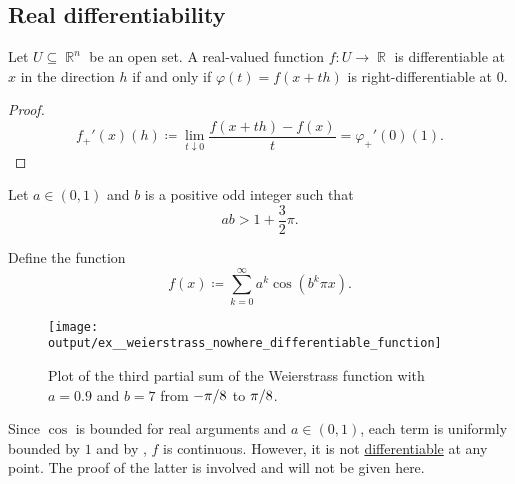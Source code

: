 \subsection{Real differentiability}\label{subsec:real_differentiability}

\begin{proposition}\label{thm:real_valued_differentiability}
  Let \( U \subseteq \BbbR^n \) be an open set. A real-valued function \( f: U \to \BbbR \) is differentiable at \( x \) in the direction \( h \) if and only if \( \varphi(t) = f(x + th) \) is right-differentiable at \( 0 \).
\end{proposition}
\begin{proof}
  \begin{equation*}
    f_+'(x)(h) \coloneqq \lim_{t \downarrow 0} \frac {f(x + th) - f(x)} t = \varphi_+'(0)(1).
  \end{equation*}
\end{proof}

\begin{example}\label{ex:weierstrass_nowhere_differentiable_function}
  Let \( a \in (0, 1) \) and \( b \) is a positive odd integer such that
  \begin{equation*}
    ab > 1 + \frac 3 2 \pi.
  \end{equation*}

  Define the function
  \begin{equation*}
    f(x) \coloneqq \sum_{k=0}^\infty a^k \cos(b^k \pi x).
  \end{equation*}

  \begin{figure}[!ht]
    \centering
    \texttt{[image: output/ex\_\_weierstrass\_nowhere\_differentiable\_function]}
    \caption
    {
      Plot of the third partial sum of the Weierstrass function with \( a = 0.9 \) and \( b = 7 \) from \( -\ifrac \pi 8 \) to \( \ifrac \pi 8 \).
    }
    \label{fig:ex:weierstrass_nowhere_differentiable_function/plot}
  \end{figure}

  Since \( \cos \) is bounded for real arguments and \( a \in (0, 1) \), each term is uniformly bounded by \( 1 \) and by , \( f \) is continuous. However, it is not \hyperref[def:differentiability]{differentiable} at any point. The proof of the latter is involved and will not be given here.
\end{example}

